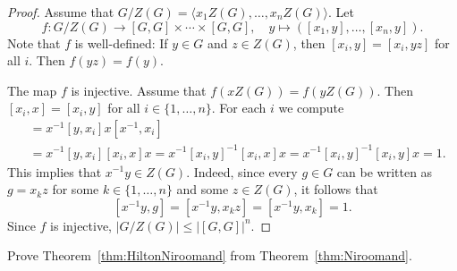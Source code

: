 \begin{proof}
	Assume that $G/Z(G)=\langle x_1Z(G),\dots,x_nZ(G)\rangle$. Let 
	\[
		f\colon G/Z(G)\to [G,G]\times\cdots\times [G,G],
		\quad
		y\mapsto ([x_1,y],\dots,[x_n,y]).
	\]
	Note that $f$ is well-defined: If $y\in G$ and $z\in Z(G)$, then $[x_i,y]=[x_i,yz]$ for all $i$. 
	Then $f(yz)=f(y)$.
	 
	The map $f$ is injective. Assume that $f(xZ(G))=f(yZ(G))$. Then 
	$[x_i,x]=[x_i,y]$ for all $i\in\{1,\dots,n\}$. For each $i$ we compute  
	\begin{align*}
		[x^{-1}y,x_i] &= x^{-1}[y,x_i]x[x^{-1},x_i]\\
		&=x^{-1}[y,x_i][x_i,x]x=x^{-1}[x_i,y]^{-1}[x_i,x]x=x^{-1}[x_i,y]^{-1}[x_i,y]x=1.
	\end{align*}
	This implies that $x^{-1}y\in Z(G)$. Indeed, since  
	every $g\in G$ can be written as $g=x_kz$ for some $k\in\{1,\dots,n\}$ and some $z\in Z(G)$, 
	it follows that 
    \[
    [x^{-1}y,g]=[x^{-1}y,x_kz]=[x^{-1}y,x_k]=1.
    \]
    Since $f$ is injective, 
	$|G/Z(G)|\leq |[G,G]|^n$. 
\end{proof}

\begin{exercise}
    Prove Theorem~\ref{thm:HiltonNiroomand} from Theorem~\ref{thm:Niroomand}. 
\end{exercise}


